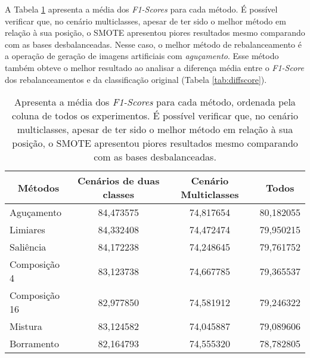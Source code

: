 A Tabela \ref{tab:allfscore} apresenta a média dos \textit{F1-Scores} para cada método. É possível verificar que, no cenário multiclasses, apesar de ter sido o melhor método em relação à sua posição, o SMOTE apresentou piores resultados mesmo comparando com as bases desbalanceadas. Nesse caso, o melhor método de rebalanceamento é a operação de geração de imagens artificiais com \textit{aguçamento}. Esse método também obteve o melhor resultado ao analisar a diferença média entre o \textit{F1-Score} dos rebalanceamentos e da classificação original (Tabela \ref{tab:diffscore}).

\begin{table}[!htbp]
\centering
\caption{Apresenta a média dos \textit{F1-Scores} para cada método, ordenada pela coluna de todos os experimentos. É possível verificar que, no cenário multiclasses, apesar de ter sido o melhor método em relação à sua posição, o SMOTE apresentou piores resultados mesmo comparando com as bases desbalanceadas.}
\label{tab:allfscore}
\begin{tabular}{|l|c|c|c|}
\hline
\multicolumn{1}{|c|}{\textbf{Métodos}} & \textbf{Cenários de duas classes} & \textbf{Cenário Multiclasses} & \textbf{Todos} \\ \hline
Aguçamento                             & 84,473575                         & 74,817654                     & 80,182055      \\ \hline
Limiares                               & 84,332408                         & 74,472474                     & 79,950215      \\ \hline
Saliência                              & 84,172238                         & 74,248645                     & 79,761752      \\ \hline
Composição 4                           & 83,123738                         & 74,667785                     & 79,365537      \\ \hline
Composição 16                          & 82,977850                         & 74,581912                     & 79,246322      \\ \hline
Mistura                                & 83,124582                         & 74,045887                     & 79,089606      \\ \hline
Borramento                             & 82,164793                         & 74,555320                     & 78,782805      \\ \hline

\end{tabular}
\end{table}

